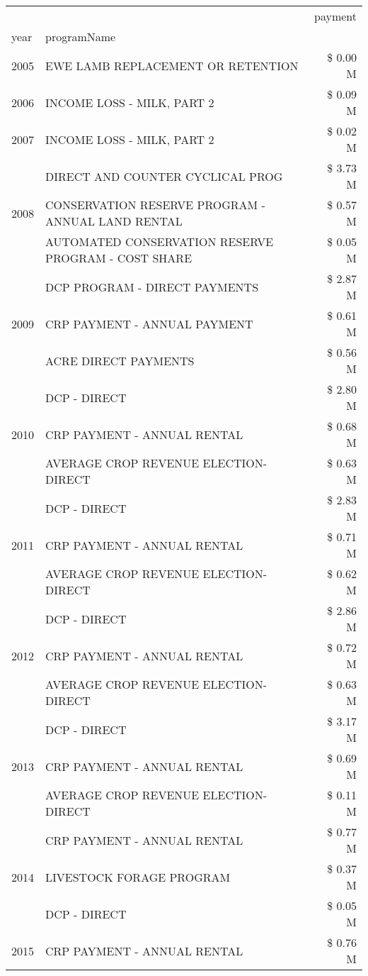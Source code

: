 \begin{tabular}{llr}
\toprule
 &  & payment \\
year & programName &  \\
\midrule
2005 & EWE LAMB REPLACEMENT OR RETENTION & \$ 0.00 M \\
\cline{1-3}
2006 & INCOME LOSS - MILK, PART 2 & \$ 0.09 M \\
\cline{1-3}
2007 & INCOME LOSS - MILK, PART 2 & \$ 0.02 M \\
\cline{1-3}
\multirow[t]{3}{*}{2008} & DIRECT AND COUNTER CYCLICAL PROG & \$ 3.73 M \\
 & CONSERVATION RESERVE PROGRAM - ANNUAL LAND RENTAL & \$ 0.57 M \\
 & AUTOMATED CONSERVATION RESERVE PROGRAM - COST SHARE & \$ 0.05 M \\
\cline{1-3}
\multirow[t]{3}{*}{2009} & DCP PROGRAM - DIRECT PAYMENTS & \$ 2.87 M \\
 & CRP PAYMENT - ANNUAL PAYMENT & \$ 0.61 M \\
 & ACRE DIRECT PAYMENTS & \$ 0.56 M \\
\cline{1-3}
\multirow[t]{3}{*}{2010} & DCP - DIRECT & \$ 2.80 M \\
 & CRP PAYMENT - ANNUAL RENTAL & \$ 0.68 M \\
 & AVERAGE CROP REVENUE ELECTION-DIRECT & \$ 0.63 M \\
\cline{1-3}
\multirow[t]{3}{*}{2011} & DCP - DIRECT & \$ 2.83 M \\
 & CRP PAYMENT - ANNUAL RENTAL & \$ 0.71 M \\
 & AVERAGE CROP REVENUE ELECTION-DIRECT & \$ 0.62 M \\
\cline{1-3}
\multirow[t]{3}{*}{2012} & DCP - DIRECT & \$ 2.86 M \\
 & CRP PAYMENT - ANNUAL RENTAL & \$ 0.72 M \\
 & AVERAGE CROP REVENUE ELECTION-DIRECT & \$ 0.63 M \\
\cline{1-3}
\multirow[t]{3}{*}{2013} & DCP - DIRECT & \$ 3.17 M \\
 & CRP PAYMENT - ANNUAL RENTAL & \$ 0.69 M \\
 & AVERAGE CROP REVENUE ELECTION-DIRECT & \$ 0.11 M \\
\cline{1-3}
\multirow[t]{3}{*}{2014} & CRP PAYMENT - ANNUAL RENTAL & \$ 0.77 M \\
 & LIVESTOCK FORAGE PROGRAM & \$ 0.37 M \\
 & DCP - DIRECT & \$ 0.05 M \\
\cline{1-3}
\multirow[t]{3}{*}{2015} & CRP PAYMENT - ANNUAL RENTAL & \$ 0.76 M \\

\end{tabular}
